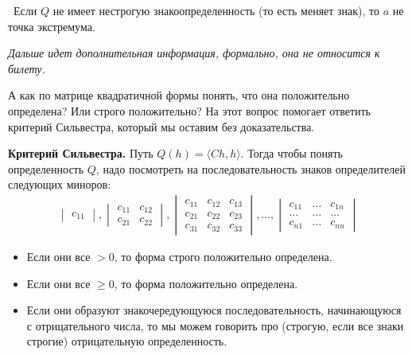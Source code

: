 \notice \, Если $Q$ не имеет нестрогую знакоопределенность (то есть меняет знак), то $a$ не точка экстремума.

\vspace*{5mm}

\textit{Дальше идет дополнительная информация, формально, она не относится к билету.}

А как по матрице квадратичной формы понять, что она положительно определена? Или строго положительно?
На этот вопрос помогает ответить критерий Сильвестра, который мы оставим без доказательства.

\textbf{Критерий Сильвестра.} Путь $Q(h) = \langle Ch, h \rangle$. 
Тогда чтобы понять определенность $Q$, надо посмотреть на последовательность знаков определителей следующих миноров: \begin{gather*}
    \begin{vmatrix}
        c_{11}
    \end{vmatrix}, \begin{vmatrix}
        c_{11} & c_{12} \\
        c_{21} & c_{22}
    \end{vmatrix}, \begin{vmatrix}
        c_{11} & c_{12} & c_{13} \\
        c_{21} & c_{22} & c_{23} \\
        c_{31} & c_{32} & c_{33}    
    \end{vmatrix}, \dots, \begin{vmatrix}
        c_{11} & \dots & c_{1n} \\
        \dots & \dots & \dots \\
        c_{n1} & \dots & c_{nn} 
    \end{vmatrix}
\end{gather*} 
\begin{itemize}
    \item Если они все $> 0$, то форма строго положительно определена.
    \item Если они все $\geqslant 0$, то форма положительно определена.
    \item Если они образуют знакочередующуюся последовательность, начинающуюся с отрицательного числа, то мы можем говорить про (строгую, если все знаки строгие) отрицательную определенность.
\end{itemize}

